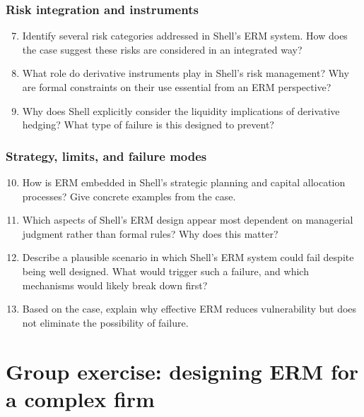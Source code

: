 \documentclass[11pt]{article}
\begin{document}
\subsubsection*{Risk integration and instruments}

\begin{enumerate}
  \setcounter{enumi}{6}
  \item Identify several risk categories addressed in Shell’s ERM system.
  How does the case suggest these risks are considered in an integrated way?

  \item What role do derivative instruments play in Shell’s risk management?
  Why are formal constraints on their use essential from an ERM perspective?

  \item Why does Shell explicitly consider the liquidity implications of
  derivative hedging? What type of failure is this designed to prevent?
\end{enumerate}

\subsubsection*{Strategy, limits, and failure modes}

\begin{enumerate}
  \setcounter{enumi}{9}
  \item How is ERM embedded in Shell’s strategic planning and capital allocation
  processes? Give concrete examples from the case.

  \item Which aspects of Shell’s ERM design appear most dependent on managerial
  judgment rather than formal rules? Why does this matter?

  \item Describe a plausible scenario in which Shell’s ERM system could fail
  despite being well designed. What would trigger such a failure, and which
  mechanisms would likely break down first?

  \item Based on the case, explain why effective ERM reduces vulnerability but
  does not eliminate the possibility of failure.
\end{enumerate}

\pagebreak


\section*{Group exercise: designing ERM for a complex firm}
\end{document}
